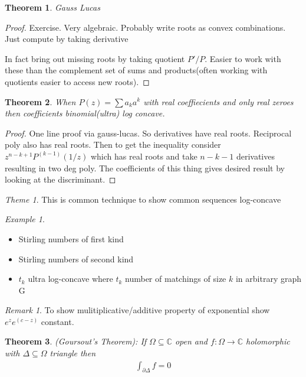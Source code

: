 \documentclass[11pt]{article}
\newcommand{\C}{\mathbb{C}}
\newtheorem{theorem}{Theorem}
\theoremstyle{remark}
\newtheorem{remark}{Remark}
\newtheorem{theme}{Theme}
\newtheorem{example}{Example}
\begin{document}
\begin{theorem}
	Gauss Lucas
\end{theorem}

\begin{proof}
	Exercise. Very algebraic. Probably write roots as convex combinations. Just compute by taking derivative

	In fact bring out missing roots by taking quotient $P'/P$. Easier to work with these than the complement set of sums and products(often working with quotients easier to access new roots).
\end{proof}

\begin{theorem}
	When $P(z) = \sum a_k a^k$ with real coeffiecients and only real zeroes then coefficients binomial(ultra) log concave.
\end{theorem}

\begin{proof}
	One line proof via gauss-lucas. So derivatives have real roots. Reciprocal poly also has real roots. Then to get the inequality consider $z^{n-k+1}P^{(k-1)}(1/z)$ which has real roots and take $n-k-1$ derivatives resulting in two deg poly. The coefficients of this thing gives desired result by looking at the discriminant.
\end{proof}

\begin{theme}
	This is common technique to show common sequences log-concave
\end{theme}

\begin{example}
	\begin{itemize}
		\item Stirling numbers of first kind
		\item Stirling numbers of second kind
		\item $t_k$ ultra log-concave where $t_k$ number of matchings of size $k$ in arbitrary graph G
	\end{itemize}
\end{example}

\begin{remark}
	To show mulitiplicative/additive property of exponential show $e^ze^(c-z)$ constant.
\end{remark}

\begin{theorem}
	(Goursout's Theorem): If $\Omega \subseteq \C$ open and $f : \Omega \to \C$ holomorphic with $\Delta \subseteq \Omega$ triangle then 
	\begin{align*}
		\int_{\partial \Delta} f = 0
	\end{align*}
\end{theorem}
\end{document}
